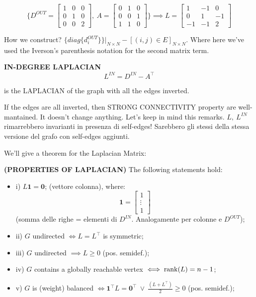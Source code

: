 \[
	\Biggl\{D^{OUT} = \begin{bmatrix}1&0&0\\0&1&0\\0&0&2\end{bmatrix},\ 
	A = \begin{bmatrix}0&1&0\\0&0&1\\1&1&0\end{bmatrix}\Biggr\} \implies
	L=\begin{bmatrix}1&-1&0\\0&1&-1\\-1&-1&2\end{bmatrix}
\]

How we construct? $\{diag\{d_i^{OUT}\}\}|_{N\times N} - [(i,j)\in E]_{N\times N}$. Where here we've used the Iverson's parenthesis notation for the second matrix term.

\begin{defn}{\textbf{IN-DEGREE LAPLACIAN}}
\[
	L^{IN} = D^{IN} - A^\top
\]
\end{defn}
is the LAPLACIAN of the graph with all the edges inverted.

If the edges are all inverted, then STRONG CONNECTIVITY property are well-mantained. It doesn't change anything. Let's keep in mind this remarks. $L,\ L^{IN}$ rimarrebbero invarianti in presenza di self-edges! Sarebbero gli stessi della stessa versione del grafo con self-edges aggiunti.

We'll give a theorem for the Laplacian Matrix:

\begin{thrm}{\textbf{(PROPERTIES OF LAPLACIAN)}} \newline
The following statements hold:
\begin{itemize}
\item{i)} $L\mathbf{1} = \mathbf{0}$; (vettore colonna), where:
\[
	\mathbf{1} = \begin{bmatrix}1\\ \vdots\\1\end{bmatrix}
\]
(somma delle righe = elementi di $D^{IN}$. Analogamente per colonne e $D^{OUT}$);
\item{ii)} $G$ undirected $\iff L=L^\top$ is symmetric;
\item{iii)} $G$ undirected $\implies L \geq 0$ (pos. semidef.);
\item{iv)}  $G$ contains a globally reachable vertex $\iff \operatorname{rank}(L) = n-1$;
\item{v)} $G$ is (weight) balanced $\iff \mathbf{1}^\top L = \mathbf{0}^\top\ \lor\ \frac{(L+L^\top)}{2} \geq 0$ (pos. semidef.);
\end{itemize}
\end{thrm}

